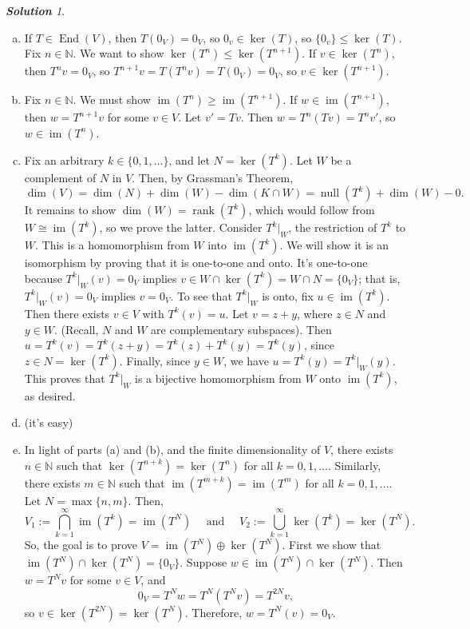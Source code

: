 \documentclass[11pt]{paper}
\theoremstyle{remark}
\newtheorem*{solution}{{\bf Solution}}
\newcommand\0{\ensuremath{\mathbf{0}}}
\newcommand{\<}{\ensuremath{\langle}}
\renewcommand{\>}{\ensuremath{\rangle}}
\newcommand\fld[1]{\ensuremath{\mathbb{#1}}}
\newcommand\N{\ensuremath{\fld{N}}}
\newcommand\End{\ensuremath{\operatorname{End}}}
\newcommand{\nulity}[1]{\ensuremath{\operatorname{null}(#1)}}
\renewcommand{\ker}[1]{\ensuremath{\operatorname{ker}(#1)}}
\renewcommand{\dim}[1]{\ensuremath{\operatorname{dim}(#1)}}
\newcommand\im[1]{\ensuremath{\operatorname{im}(#1)}}
\newcommand{\rank}[1]{\ensuremath{\operatorname{rank}(#1)}}
\renewcommand{\leq}{\ensuremath{\leqslant}}
\renewcommand{\geq}{\ensuremath{\geqslant}}
\begin{document}
\begin{solution}
  \begin{enumerate}[(a)]
  \item If $T \in \End(V)$, then $T(0_V) = 0_V$, so $0_v\in \ker{T}$, so 
    $\{0_v\}\leq \ker{T}$.  Fix $n \in \N$.  We want to show 
    $\ker{T^n} \leq \ker{T^{n+1}}$. If $v\in \ker{T^n}$, then $T^nv = 0_V$, so 
    $T^{n+1}v = T(T^nv) = T(0_V) = 0_V$, so $v\in \ker{T^{n+1}}$.
\item  Fix $n \in \N$.  We must show $\im{T^n} \geq \im{T^{n+1}}$. 
If $w \in \im{T^{n+1}}$, then $w = T^{n+1}v$ for some $v\in V$. Let $v' =  Tv$.
Then $w =  T^n (Tv) = T^nv'$, so  $w \in \im{T^n}$.

\item Fix an arbitrary $k \in \{0, 1, \dots\}$, and let $N = \ker{T^k}$.  Let
  $W$ be a complement of $N$ in $V$.  Then, by Grassman's Theorem, 
\[
\dim{V} = \dim{N} + \dim{W}-\dim{K\cap W} = \nulity{T^k} + \dim{W} - 0.
\]
It remains to show $\dim{W} = \rank{T^k}$, which would follow from
$W \cong \im{T^k}$, so we prove the latter.  Consider $T^k|_W$, the restriction
of $T^k$ to $W$. This is a homomorphism from $W$ into $\im{T^k}$.  We will show it is an
isomorphism by proving that it is one-to-one and onto.  It's one-to-one because 
$T^k|_W(v) = 0_V$ implies $v \in W \cap \ker{T^k} =  W \cap N = \{0_V\}$;
that is, $T^k|_W(v) = 0_V$ implies $v = 0_V$. To see that $T^k|_W$ is onto, fix
$u \in \im{T^k}$. Then there exists $v\in V$ with $T^k(v) = u$.  Let $v = z+y$,
where $z \in N$ and $y\in W$. (Recall, $N$ and $W$ are complementary
subspaces). Then $u = T^k(v) = T^k(z+y) =  T^k(z)+ T^k(y) = T^k(y)$, since $z
\in N = \ker{T^k}$. Finally, since  $y\in W$, we have $u = T^k(y) = T^k|_W(y)$.
This proves that $T^k|_W$ is a bijective homomorphism from $W$ onto $\im{T^k}$,
as desired.
\item (it's easy)
\item In light of parts (a) and (b), and the finite dimensionality of $V$, there
  exists $n\in \N$ such that $\ker{T^{n+k}} = \ker{T^{n}}$ for all $k =0, 1, \dots$.
Similarly, there exists $m\in \N$ such that 
$\im{T^{m+k}} = \im{T^{m}}$ for all $k =0, 1, \dots$. Let $N = \max\{n, m\}$. Then,
\[
V_1 := \bigcap\limits_{k=1}^\infty \im{T^k}= \im{T^N} \quad \text{ and } \quad
V_2 := \bigcup\limits_{k=1}^\infty \ker{T^k}= \ker{T^N}.
\]
So, the goal is to prove 
$V = \im{T^N} \oplus \ker{T^N}$. First we show that 
$\im{T^N} \cap \ker{T^N} = \{0_V\}$. 
Suppose $w \in \im{T^N} \cap \ker{T^N}$.  Then $w = T^Nv$ for some $v\in V$,
and 
\[
0_V = T^Nw = T^N (T^Nv) = T^{2N}v,
\]
so $v \in \ker{T^{2N}} =
\ker{T^{N}}$.
Therefore, $w = T^N(v) = 0_V$. 


\end{enumerate}
\end{solution}
\end{document}
